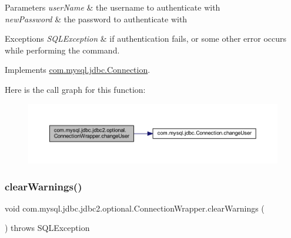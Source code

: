 \begin{DoxyParams}{Parameters}
{\em user\+Name} & the username to authenticate with \\
\hline
{\em new\+Password} & the password to authenticate with \\
\hline
\end{DoxyParams}

\begin{DoxyExceptions}{Exceptions}
{\em S\+Q\+L\+Exception} & if authentication fails, or some other error occurs while performing the command. \\
\hline
\end{DoxyExceptions}


Implements \mbox{\hyperlink{interfacecom_1_1mysql_1_1jdbc_1_1_connection_a6a6160ecb2c19b5f246450ba9252907d}{com.\+mysql.\+jdbc.\+Connection}}.

Here is the call graph for this function\+:
\nopagebreak
\begin{figure}[H]
\begin{center}
\leavevmode
\includegraphics[width=350pt]{classcom_1_1mysql_1_1jdbc_1_1jdbc2_1_1optional_1_1_connection_wrapper_a4c5b794f1bdf800b863c46fdcbf2ce97_cgraph}
\end{center}
\end{figure}
\mbox{\label{classcom_1_1mysql_1_1jdbc_1_1jdbc2_1_1optional_1_1_connection_wrapper_aba9c23c688373ab8dac28e81b7eb8780}} 
\subsubsection{\texorpdfstring{clear\+Warnings()}{clearWarnings()}}
{\footnotesize\ttfamily void com.\+mysql.\+jdbc.\+jdbc2.\+optional.\+Connection\+Wrapper.\+clear\+Warnings (\begin{DoxyParamCaption}{ }\end{DoxyParamCaption}) throws S\+Q\+L\+Exception}

